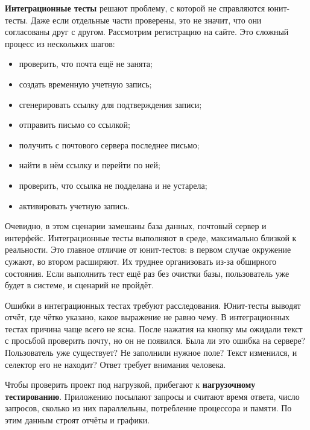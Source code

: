 \textbf{Интеграционные тесты} решают проблему, с которой не справляются
юнит-тесты. Даже если отдельные части проверены, это не значит, что они
согласованы друг с другом. Рассмотрим регистрацию на сайте. Это сложный процесс
из нескольких шагов:

\begin{itemize}

\item
  проверить, что почта ещё не занята;

\item
  создать временную учетную запись;

\item
  сгенерировать ссылку для подтверждения записи;

\item
  отправить письмо со ссылкой;

\item
  получить с почтового сервера последнее письмо;

\item
  найти в нём ссылку и перейти по ней;

\item
  проверить, что ссылка не подделана и не устарела;

\item
  активировать учетную запись.

\end{itemize}

Очевидно, в этом сценарии замешаны база данных, почтовый сервер и интерфейс.
Интеграционные тесты выполняют в среде, максимально близкой к реальности. Это
главное отличие от юнит-тестов: в первом случае окружение сужают, во втором
расширяют. Их труднее организовать из-за обширного состояния. Если выполнить
тест ещё раз без очистки базы, пользователь уже будет в системе, и сценарий не
пройдёт.

Ошибки в интеграционных тестах требуют расследования. Юнит-тесты выводят отчёт,
где чётко указано, какое выражение не равно чему. В интеграционных тестах
причина чаще всего не ясна. После нажатия на кнопку мы ожидали текст с просьбой
проверить почту, но он не появился. Была ли это ошибка на сервере? Пользователь
уже существует? Не заполнили нужное поле? Текст изменился, и селектор его не
находит? Ответ требует внимания человека.


Чтобы проверить проект под нагрузкой, прибегают к \textbf{нагрузочному тестированию}.
Приложению посылают запросы и считают время ответа, число запросов, сколько
из них параллельны, потребление процессора и памяти. По этим данным строят
отчёты и графики.

